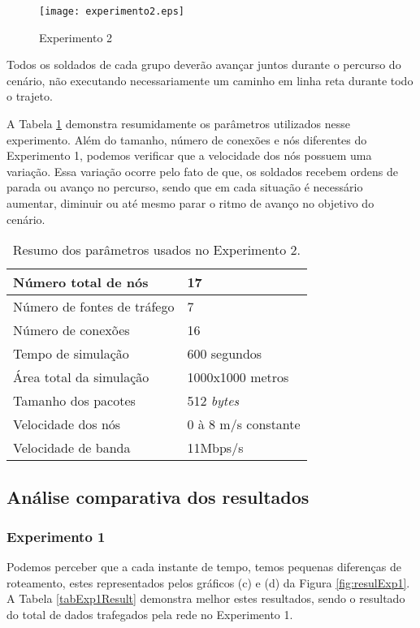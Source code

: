 \begin{figure}[H]
	\centering
	\texttt{[image: experimento2.eps]}
	\caption{Experimento 2}
	\label{figExp2}
\end{figure}

Todos os soldados de cada grupo dever\~ao avan\c{c}ar juntos durante o percurso do cen\'ario, n\~ao executando necessariamente um caminho em linha reta durante todo o trajeto.

A Tabela \ref{tabParamExp2} demonstra resumidamente os par\^ametros utilizados nesse experimento. 
Al\'em do tamanho, n\'umero de conex\~oes e n\'os diferentes do Experimento 1, podemos verificar que a velocidade dos n\'os possuem uma varia\c{c}\~ao.
Essa varia\c{c}\~ao ocorre pelo fato de que, os soldados recebem ordens de parada ou avan\c{c}o no percurso, sendo que em cada situa\c{c}\~ao \'e necess\'ario aumentar, diminuir ou at\'e mesmo parar o ritmo de avan\c{c}o no objetivo do cen\'ario.

\begin{table}[H]
	\centering
	\caption{Resumo dos par\^ametros usados no Experimento 2.}
	\begin{tabular}{ | l | l | }
		\hline
		N\'umero total de n\'os & 17 \\ \hline
		N\'umero de fontes de tr\'afego & 7 \\ \hline
		N\'umero de conex\~oes & 16 \\ \hline
		Tempo de simula\c{c}\~ao & 600 segundos \\ \hline
		\'Area total da simula\c{c}\~ao & 1000x1000 metros \\ \hline
		Tamanho dos pacotes & 512 \textit{bytes} \\ \hline
		Velocidade dos n\'os & 0 \`a 8 m/s constante \\ \hline
		Velocidade de banda & 11Mbps/s \\ \hline
	\end{tabular}
	\label{tabParamExp2}
\end{table}

\subsection{An\'alise comparativa dos resultados}

\subsubsection{Experimento 1}


Podemos perceber que a cada instante de tempo, temos pequenas diferen\c{c}as de roteamento, estes representados pelos gr\'aficos (c) e (d) da Figura \ref{fig:resulExp1}. A Tabela \ref{tabExp1Result} demonstra melhor estes resultados, sendo o resultado do total de dados trafegados pela rede no Experimento 1.

